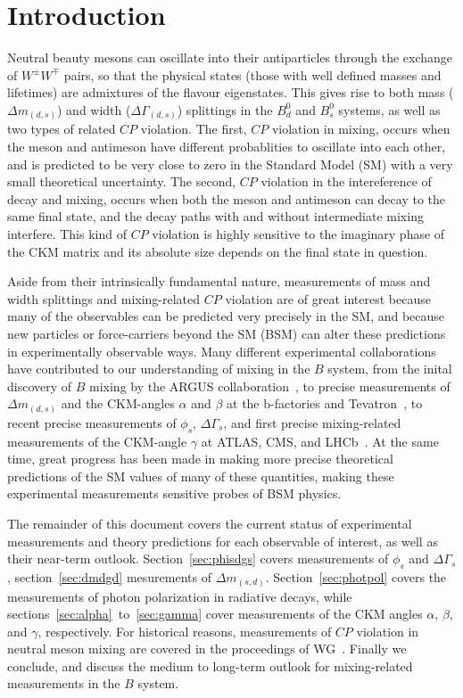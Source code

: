 \section{Introduction}
Neutral beauty mesons can oscillate into their antiparticles through the exchange of $W^\pm W^\mp$ pairs, so that the 
physical states (those with well defined masses and lifetimes) are admixtures of the flavour eigenstates. This gives
rise to both mass ($\Delta m_{(d,s)}$) and width ($\Delta\Gamma_{(d,s)}$) splittings in the $B^0_d$ and $B^0_s$ systems, as well
as two types of related $CP$ violation. The first, $CP$ violation in mixing, occurs when the meson and antimeson have different
probablities to oscillate into each other, and is predicted to be very close to zero in the Standard Model (SM) with a very
small theoretical uncertainty. The second, $CP$ violation in the intereference of decay and mixing, occurs when both the meson
and antimeson can decay to the same final state, and the decay paths with and without intermediate mixing interfere. This kind of $CP$
violation is highly sensitive to the imaginary phase of the CKM matrix and its absolute size depends on the final state in question.

Aside from their intrinsically fundamental nature, measurements of mass and width splittings and mixing-related $CP$ violation are
of great interest because many of the observables can be predicted very precisely in the SM, and because new particles or force-carriers
beyond the SM (BSM) can alter these predictions in experimentally observable ways. Many different experimental collaborations have contributed
to our understanding of mixing in the $B$ system, from the inital discovery of $B$ mixing by the ARGUS collaboration~\cite{}, to precise measurements
of $\Delta m_{(d,s)}$ and the CKM-angles $\alpha$ and $\beta$ at the b-factories and Tevatron~\cite{}, to recent precise measurements
of $\phi_s$, $\Delta\Gamma_s$, and first precise mixing-related measurements of the CKM-angle $\gamma$ at ATLAS, CMS, and LHCb~\cite{}. At the same
time, great progress has been made in making more precise theoretical predictions of the SM values of many of these quantities, making
these experimental measurements sensitive probes of BSM physics.

The remainder of this document covers the current status of experimental measurements and theory predictions for each observable of
interest, as well as their near-term outlook. Section~\ref{sec:phisdgs} covers measurements of $\phi_s$ and $\Delta\Gamma_s$, section~\ref{sec:dmdgd} 
mesurements of $\Delta m_{(s,d)}$. Section~\ref{sec:photpol} covers the measurements of photon polarization in radiative decays, while
sections~\ref{sec:alpha}~to~\ref{sec:gamma} cover measurements of the CKM angles $\alpha$, $\beta$, and $\gamma$, respectively.
For historical reasons, measurements of $CP$ violation in neutral meson mixing are covered in the proceedings of WG~\cite{}. Finally we conclude,
and discuss the medium to long-term outlook for mixing-related measurements in the $B$ system.


